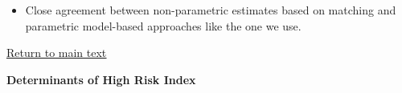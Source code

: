 \documentclass[static]{JJH-Beamer}
\begin{document}
\begin{frame}

\begin{itemize}
\item Close agreement between non-parametric estimates based on matching and parametric model-based approaches like the one we use.
\end{itemize}

\end{frame}

\begin{frame}

\begin{center}
\hyperlink{ret:potpie}{\underline{Return to main text}}
\end{center}

\end{frame}

{}
\begin{frame}

\hypertarget{chocohocochip}{}
\begin{center}
\textbf{Determinants of High Risk Index}
\end{center}

\end{frame}
\end{document}
